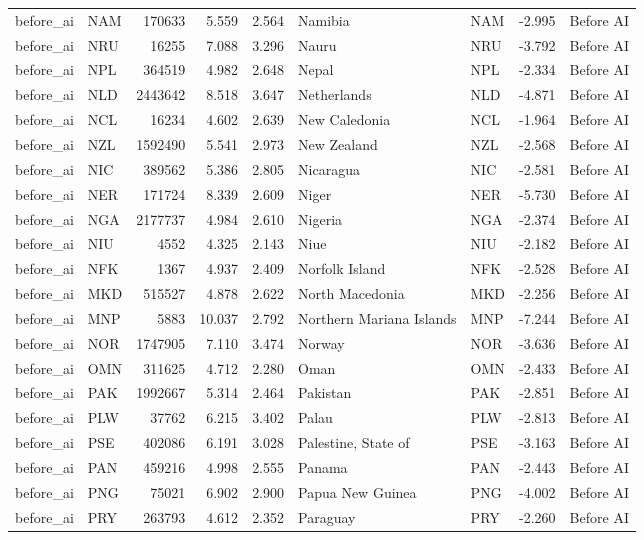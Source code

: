 \begin{tabular}{llrrrllrl}
before\_ai & NAM & 170633 & 5.559 & 2.564 & Namibia & NAM & -2.995 & Before AI \\
before\_ai & NRU & 16255 & 7.088 & 3.296 & Nauru & NRU & -3.792 & Before AI \\
before\_ai & NPL & 364519 & 4.982 & 2.648 & Nepal & NPL & -2.334 & Before AI \\
before\_ai & NLD & 2443642 & 8.518 & 3.647 & Netherlands & NLD & -4.871 & Before AI \\
before\_ai & NCL & 16234 & 4.602 & 2.639 & New Caledonia & NCL & -1.964 & Before AI \\
before\_ai & NZL & 1592490 & 5.541 & 2.973 & New Zealand & NZL & -2.568 & Before AI \\
before\_ai & NIC & 389562 & 5.386 & 2.805 & Nicaragua & NIC & -2.581 & Before AI \\
before\_ai & NER & 171724 & 8.339 & 2.609 & Niger & NER & -5.730 & Before AI \\
before\_ai & NGA & 2177737 & 4.984 & 2.610 & Nigeria & NGA & -2.374 & Before AI \\
before\_ai & NIU & 4552 & 4.325 & 2.143 & Niue & NIU & -2.182 & Before AI \\
before\_ai & NFK & 1367 & 4.937 & 2.409 & Norfolk Island & NFK & -2.528 & Before AI \\
before\_ai & MKD & 515527 & 4.878 & 2.622 & North Macedonia & MKD & -2.256 & Before AI \\
before\_ai & MNP & 5883 & 10.037 & 2.792 & Northern Mariana Islands & MNP & -7.244 & Before AI \\
before\_ai & NOR & 1747905 & 7.110 & 3.474 & Norway & NOR & -3.636 & Before AI \\
before\_ai & OMN & 311625 & 4.712 & 2.280 & Oman & OMN & -2.433 & Before AI \\
before\_ai & PAK & 1992667 & 5.314 & 2.464 & Pakistan & PAK & -2.851 & Before AI \\
before\_ai & PLW & 37762 & 6.215 & 3.402 & Palau & PLW & -2.813 & Before AI \\
before\_ai & PSE & 402086 & 6.191 & 3.028 & Palestine, State of & PSE & -3.163 & Before AI \\
before\_ai & PAN & 459216 & 4.998 & 2.555 & Panama & PAN & -2.443 & Before AI \\
before\_ai & PNG & 75021 & 6.902 & 2.900 & Papua New Guinea & PNG & -4.002 & Before AI \\
before\_ai & PRY & 263793 & 4.612 & 2.352 & Paraguay & PRY & -2.260 & Before AI \\

\end{tabular}
